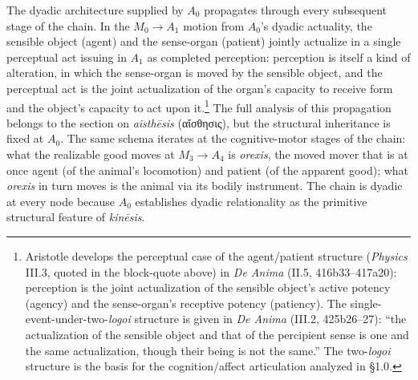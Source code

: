 \documentclass{article}
\newcommand{\gk}[1]{{\greekfont #1}}
\begin{document}
The dyadic architecture supplied by $A_0$ propagates through every subsequent stage of the chain. In the $M_0 \rightarrow A_1$ motion from $A_0$'s dyadic actuality, the sensible object (agent) and the sense-organ (patient) jointly actualize in a single perceptual act issuing in $A_1$ as completed perception: perception is itself a kind of alteration, in which the sense-organ is moved by the sensible object, and the perceptual act is the joint actualization of the organ's capacity to receive form and the object's capacity to act upon it.\footnote{Aristotle develops the perceptual case of the agent/patient structure (\textit{Physics} III.3, quoted in the block-quote above) in \textit{De Anima} (II.5, 416b33--417a20): perception is the joint actualization of the sensible object's active potency (agency) and the sense-organ's receptive potency (patiency). The single-event-under-two-\textit{logoi} structure is given in \textit{De Anima} (III.2, 425b26--27): ``the actualization of the sensible object and that of the percipient sense is one and the same actualization, though their being is not the same.'' The two-\textit{logoi} structure is the basis for the cognition/affect articulation analyzed in \S 1.0.} The full analysis of this propagation belongs to the section on \textit{aisthēsis} (\gk{αἴσθησις}), but the structural inheritance is fixed at $A_0$. The same schema iterates at the cognitive-motor stages of the chain: what the realizable good moves at $M_3 \rightarrow A_4$ is \textit{orexis}, the moved mover that is at once agent (of the animal's locomotion) and patient (of the apparent good); what \textit{orexis} in turn moves is the animal via its bodily instrument. The chain is dyadic at every node because $A_0$ establishes dyadic relationality as the primitive structural feature of \textit{kinēsis}.
\end{document}
